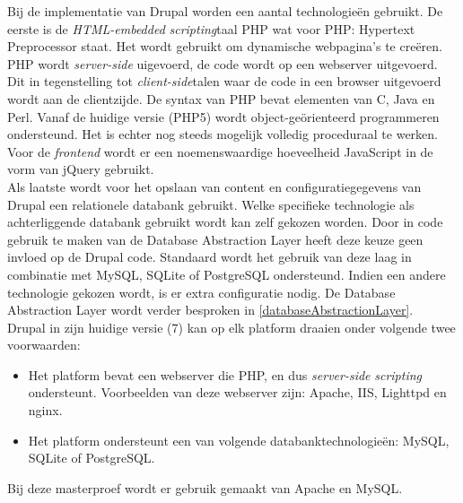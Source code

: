 Bij de implementatie van Drupal worden een aantal technologie\"{e}n gebruikt. De eerste is de \textit{HTML-embedded} \textit{scripting}taal PHP wat voor PHP: Hypertext Preprocessor staat. Het wordt gebruikt om dynamische webpagina's te cre\"{e}ren. PHP wordt \textit{server-side} uigevoerd, de code wordt op een webserver uitgevoerd. Dit in tegenstelling tot \textit{client-side}talen waar de code in een browser uitgevoerd wordt aan de clientzijde. De syntax van PHP bevat elementen van C, Java en Perl. Vanaf de huidige versie (PHP5) wordt object-ge\"{o}rienteerd programmeren ondersteund. Het is echter nog steeds mogelijk volledig proceduraal te werken.\\

Voor de \textit{frontend} wordt er een noemenswaardige hoeveelheid JavaScript in de vorm van jQuery gebruikt.\\

Als laatste wordt voor het opslaan van content en configuratiegegevens van Drupal een relationele databank gebruikt. Welke specifieke technologie als achterliggende databank gebruikt wordt kan zelf gekozen worden. Door in code gebruik te maken van de Database Abstraction Layer heeft deze keuze geen invloed op de Drupal code. Standaard wordt het gebruik van deze laag in combinatie met MySQL, SQLite of PostgreSQL ondersteund. Indien een andere technologie gekozen wordt, is er extra configuratie nodig. De Database Abstraction Layer wordt verder besproken in \ref{databaseAbstractionLayer}.\\

\noindent
Drupal in zijn huidige versie (7) kan op elk platform draaien onder volgende twee voorwaarden:
\begin{itemize}
\item Het platform bevat een webserver die PHP, en dus \textit{server-side} \textit{scripting} ondersteunt. Voorbeelden van deze webserver zijn:  Apache, IIS, Lighttpd en nginx.
\item Het platform ondersteunt een van volgende databanktechnologie\"{e}n: MySQL, SQLite of PostgreSQL.
\end{itemize}
Bij deze masterproef wordt er gebruik gemaakt van Apache en MySQL.

